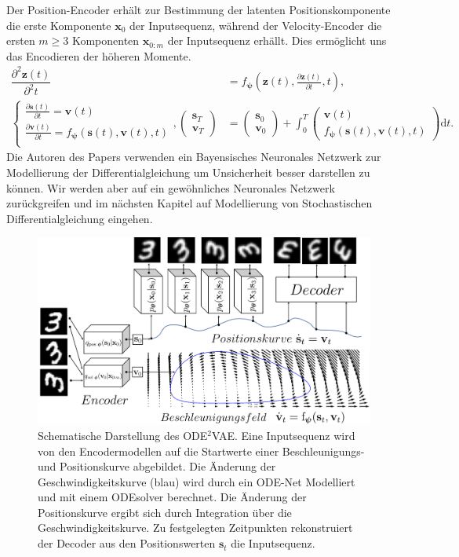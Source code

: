 \documentclass[12pt]{article}
\begin{document}
	Der Position-Encoder erhält zur Bestimmung der latenten Positionskomponente die erste Komponente $\mathbf x_{0}$ der Inputsequenz, während der Velocity-Encoder die ersten $m\geq 3$ Komponenten $\mathbf x_{0:m}$ der Inputsequenz erhällt. Dies ermöglicht uns das Encodieren der höheren Momente.
	\begin{align*}
	\dfrac{\partial^2 \mathbf{z}(t)}{\partial^2 t}&=f_{\boldsymbol{\psi}}\left(\mathbf{z}(t), \tfrac{\partial \mathbf{z}(t)}{\partial t}, t\right), \\
	\begin{cases*}
	\tfrac{\partial \mathbf{s}(t)}{\partial t}=\mathbf v(t) \\
	\tfrac{\partial \mathbf{v}(t)}{\partial t}=f_{\boldsymbol{\psi}}(\mathbf s(t), \mathbf v(t), t) \\
	\end{cases*},
	\left(\begin{array}{cc}
	\mathbf s_{T} \\
	\mathbf v_{T}
	\end{array}\right)
	&=
	\left(\begin{array}{cc}
	\mathbf s_{0} \\
	\mathbf v_{0}
	\end{array}\right)
	+
	\int_{0}^{T}
	\left(\begin{array}{cc}
	\mathbf v(t) \\
	f_{\boldsymbol{\psi}}(\mathbf s(t), \mathbf v(t), t)
	\end{array}\right)
	\mathrm{d}t.
	\end{align*}
	Die Autoren des Papers verwenden ein Bayensisches Neuronales Netzwerk zur Modellierung der Differentialgleichung um Unsicherheit besser darstellen zu können. Wir werden aber auf ein gewöhnliches Neuronales Netzwerk zurückgreifen und im nächsten Kapitel auf Modellierung von Stochastischen Differentialgleichung eingehen.
	\begin{figure}[h!]
		\centering
		\includegraphics[scale=0.57]{ODE2VAE_ODE_Net}
		\captionsetup{labelformat=empty}
		\caption{Schematische Darstellung des ODE$^2$VAE. Eine Inputsequenz wird von den Encodermodellen auf die Startwerte einer Beschleunigungs- und Positionskurve abgebildet. Die Änderung der Geschwindigkeitskurve (blau) wird durch ein ODE-Net Modelliert und mit einem ODEsolver berechnet. Die Änderung der Positionskurve ergibt sich durch Integration über die Geschwindigkeitskurve. Zu festgelegten Zeitpunkten rekonstruiert der Decoder aus den Positionswerten $\mathbf{s}_t$ die Inputsequenz.}
	\end{figure}
\end{document}
